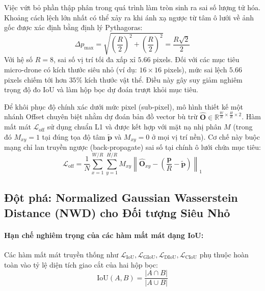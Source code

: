 \documentclass[11pt,a4paper]{article}
\begin{document}
Việc vứt bỏ phần thập phân trong quá trình làm tròn sinh ra sai số lượng tử hóa. Khoảng cách lệch lớn nhất có thể xảy ra khi ánh xạ ngược từ tâm ô lưới về ảnh gốc được xác định bằng định lý Pythagoras:
\begin{equation}
    \Delta p_{\max} = \sqrt{\left(\frac{R}{2}\right)^2 + \left(\frac{R}{2}\right)^2} = \frac{R\sqrt{2}}{2}
\end{equation}
Với hệ số $R = 8$, sai số vị trí tối đa xấp xỉ $5.66$ pixels. Đối với các mục tiêu micro-drone có kích thước siêu nhỏ (ví dụ: $16 \times 16$ pixels), mức sai lệch $5.66$ pixels chiếm tới hơn $35\%$ kích thước vật thể. Điều này gây suy giảm nghiêm trọng độ đo IoU và làm hộp bọc dự đoán trượt khỏi mục tiêu.

Để khôi phục độ chính xác dưới mức pixel (sub-pixel), mô hình thiết kế một nhánh Offset chuyên biệt nhằm dự đoán bản đồ vector bù trừ $\hat{\mathbf{O}} \in \mathbb{R}^{\frac{W}{R} \times \frac{H}{R} \times 2}$. Hàm mất mát $\mathcal{L}_{\text{off}}$ sử dụng chuẩn L1 và được kết hợp với mặt nạ nhị phân $M$ (trong đó $M_{xy} = 1$ tại đúng tọa độ tâm $\tilde{\mathbf{p}}$ và $M_{xy} = 0$ ở mọi vị trí nền). Cơ chế này buộc mạng chỉ lan truyền ngược (back-propagate) sai số tại chính ô lưới chứa mục tiêu:
\begin{equation}
    \mathcal{L}_{\text{off}} = \frac{1}{N} \sum_{x=1}^{W/R} \sum_{y=1}^{H/R} M_{xy} \left\| \hat{\mathbf{O}}_{xy} - \left( \frac{\mathbf{p}}{R} - \tilde{\mathbf{p}} \right) \right\|_1
\end{equation}

\subsection{Đột phá: Normalized Gaussian Wasserstein Distance (NWD) cho Đối tượng Siêu Nhỏ}
\label{sec:nwd_loss}

\paragraph{Hạn chế nghiêm trọng của các hàm mất mát dạng IoU:}
Các hàm mất mát truyền thống như $\mathcal{L}_{\text{IoU}}, \mathcal{L}_{\text{GIoU}}, \mathcal{L}_{\text{DIoU}}, \mathcal{L}_{\text{CIoU}}$ phụ thuộc hoàn toàn vào tỷ lệ diện tích giao cắt của hai hộp bọc:
\begin{equation}
    \text{IoU}(A, B) = \frac{|A \cap B|}{|A \cup B|}
\end{equation}
\end{document}

